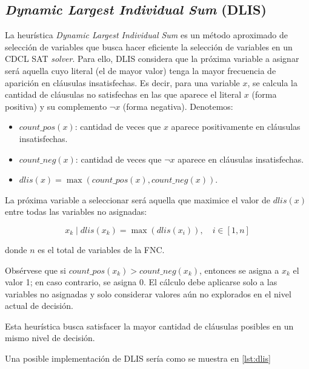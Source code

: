 \subsection{\textit{Dynamic Largest Individual Sum} (DLIS)}
\label{sec}
La heur\'istica \textit{Dynamic Largest Individual Sum} es un m\'etodo aproximado de selecci\'on de variables que busca hacer eficiente la selecci\'on de variables en un CDCL SAT \textit{solver}. Para ello, DLIS considera que la pr\'oxima variable a asignar ser\'a aquella cuyo literal (el de mayor valor) tenga la mayor frecuencia de aparici\'on en cl\'ausulas insatisfechas. Es decir, para una variable $x$, se calcula la cantidad de cl\'ausulas no satisfechas en las que aparece el literal $x$ (forma positiva) y su complemento $\neg x$ (forma negativa). Denotemos:

\begin{itemize}
  \item $\textit{count\_pos}(x)$: cantidad de veces que $x$ aparece positivamente en cl\'ausulas insatisfechas.
  \item $\textit{count\_neg}(x)$: cantidad de veces que $\neg x$ aparece en cl\'ausulas insatisfechas.
  \item $\textit{dlis}(x) = \max(\textit{count\_pos}(x), \textit{count\_neg}(x))$.
\end{itemize}

La pr\'oxima variable a seleccionar ser\'a aquella que maximice el valor de $\textit{dlis}(x)$ entre todas las variables no asignadas:

\begin{equation*}
  x_k \mid \textit{dlis}(x_k) = \max(\textit{dlis}(x_i)),\quad i \in [1,n]
\end{equation*}

donde $n$ es el total de variables de la FNC.

Obs\'ervese que si $\textit{count\_pos}(x_k) > \textit{count\_neg}(x_k)$, entonces se asigna a $x_k$ el valor 1; en caso contrario, se asigna 0. El c\'alculo debe aplicarse solo a las variables no asignadas y solo considerar valores a\'{u}n no explorados en el nivel actual de decisi\'on.

Esta heur\'istica busca satisfacer la mayor cantidad de cl\'ausulas posibles en un mismo nivel de decisi\'on.

Una posible implementaci\'on de DLIS ser\'ia como se muestra en \ref{lst:dlis}

